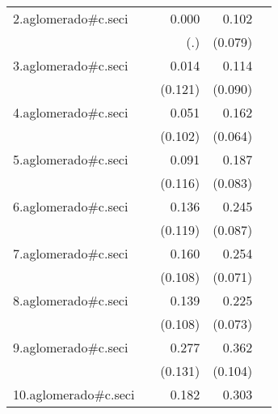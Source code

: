 {\begin{longtable}{l*{4}{D{.}{.}{-1}}}
\addlinespace
2.aglomerado#c.seci&                     &       0.000         &       0.102         &                     \\
            &                     &         (.)         &     (0.079)         &                     \\
\addlinespace
3.aglomerado#c.seci&                     &       0.014         &       0.114         &                     \\
            &                     &     (0.121)         &     (0.090)         &                     \\
\addlinespace
4.aglomerado#c.seci&                     &       0.051         &       0.162\sym{*}  &                     \\
            &                     &     (0.102)         &     (0.064)         &                     \\
\addlinespace
5.aglomerado#c.seci&                     &       0.091         &       0.187\sym{*}  &                     \\
            &                     &     (0.116)         &     (0.083)         &                     \\
\addlinespace
6.aglomerado#c.seci&                     &       0.136         &       0.245\sym{**} &                     \\
            &                     &     (0.119)         &     (0.087)         &                     \\
\addlinespace
7.aglomerado#c.seci&                     &       0.160         &       0.254\sym{***}&                     \\
            &                     &     (0.108)         &     (0.071)         &                     \\
\addlinespace
8.aglomerado#c.seci&                     &       0.139         &       0.225\sym{**} &                     \\
            &                     &     (0.108)         &     (0.073)         &                     \\
\addlinespace
9.aglomerado#c.seci&                     &       0.277\sym{*}  &       0.362\sym{***}&                     \\
            &                     &     (0.131)         &     (0.104)         &                     \\
\addlinespace
10.aglomerado#c.seci&                     &       0.182         &       0.303\sym{***}&                     \\

\end{longtable}}
